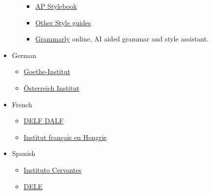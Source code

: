 \documentclass{article}
\begin{document}
\begin{itemize}
\begin{itemize}
\begin{itemize}
            \item \href{https://www.apstylebook.com/}{AP Stylebook}
            \item \href{https://en.wikipedia.org/wiki/Style_guide}{Other Style guides}
            \item \href{https://app.grammarly.com/}{Grammarly} online, AI aided grammar and style assistant.
        \end{itemize}
    \end{itemize}
    \item German
    \begin{itemize}
        \item \href{https://www.goethe.de/en/index.html}{Goethe-Institut}
        \item \href{https://www.oesterreichinstitut.com/en/}{Österreich Institut}
    \end{itemize}
    \item French
    \begin{itemize}
        \item \href{http://www.delfdalf.fr/index-en.html}{DELF DALF}
        \item \href{https://www.franciaintezet.hu/}{Institut français en Hongrie}
    \end{itemize}
    \item Spanish
    \begin{itemize}
        \item \href{https://www.cervantes.es/}{Instituto Cervantes} 
        \item \href{https://www.dele.org/}{DELE}
    \end{itemize}


\end{itemize}
\end{document}
